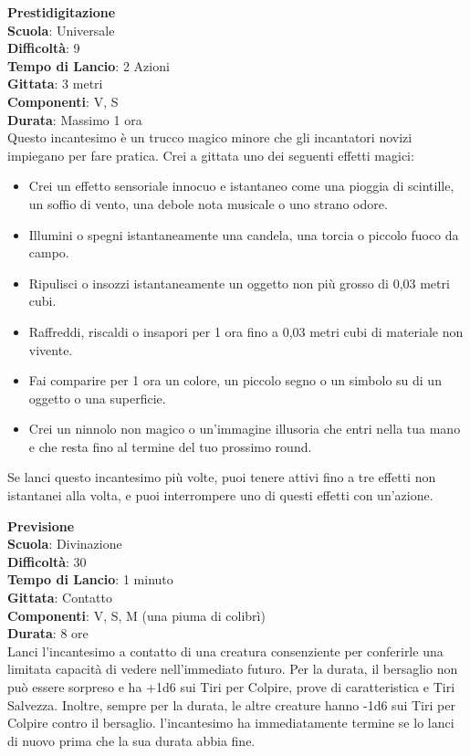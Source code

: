 \begin{multicols}{2}
\medskip\textbf{Prestidigitazione}\\
\textbf{Scuola}: Universale\\
\textbf{Difficoltà}:  9\\
\textbf{Tempo di Lancio}: 2 Azioni\\
\textbf{Gittata}: 3 metri\\
\textbf{Componenti}: V, S\\
\textbf{Durata}: Massimo 1 ora\\
Questo incantesimo è un trucco magico minore che gli incantatori novizi impiegano per fare pratica. Crei a gittata uno dei seguenti effetti magici:
\medskip
\begin{itemize}
\item
Crei un effetto sensoriale innocuo e istantaneo come una pioggia di scintille, un soffio di vento, una debole nota musicale o uno strano odore.
\item
Illumini o spegni istantaneamente una candela, una torcia o piccolo fuoco da campo.
\item
Ripulisci o insozzi istantaneamente un oggetto non più grosso di 0,03 metri cubi.
\item
Raffreddi, riscaldi o insapori per 1 ora fino a 0,03 metri cubi di materiale non vivente.
\item
Fai comparire per 1 ora un colore, un piccolo segno o un simbolo su di un oggetto o una superficie.
\item
Crei un ninnolo non magico o un'immagine illusoria che entri nella tua mano e che resta fino al termine del tuo prossimo round.
\end{itemize}
\medskip
Se lanci questo incantesimo più volte, puoi tenere attivi fino a tre effetti non istantanei alla volta, e puoi interrompere uno di questi effetti con un'azione.

\medskip\textbf{Previsione}\\
\textbf{Scuola}: Divinazione\\
\textbf{Difficoltà}:  30\\
\textbf{Tempo di Lancio}: 1 minuto\\
\textbf{Gittata}: Contatto\\
\textbf{Componenti}: V, S, M (una piuma di colibrì)\\
\textbf{Durata}: 8 ore\\
Lanci l'incantesimo a contatto di una creatura consenziente per conferirle una limitata capacità di vedere nell'immediato futuro. Per la durata, il bersaglio non può essere sorpreso e ha +1d6 sui Tiri per Colpire, prove di caratteristica e Tiri Salvezza. Inoltre, sempre per la durata, le altre creature hanno -1d6 sui Tiri per Colpire contro il bersaglio. l'incantesimo ha immediatamente termine se lo lanci di nuovo prima che la sua durata abbia fine.


\end{multicols}
